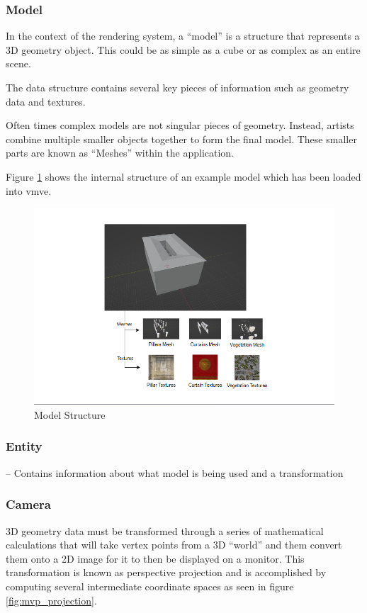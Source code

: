 \documentclass[11pt]{article}
\begin{document}
\subsubsection{Model}
In the context of the rendering system, a ``model'' is a structure that represents
a 3D geometry object. This could be as simple as a cube or as complex as an
entire scene.

The data structure contains several key pieces of information such as geometry data
and textures. 

Often times complex models are not singular pieces of geometry. Instead, artists
combine multiple smaller objects together to form the final model. These smaller
parts are known as ``Meshes'' within the application.

Figure \ref{fig:model} shows the internal structure of an example model which has been
loaded into \gls{vmve}.
\begin{figure}[h!]
  \centering
  \includegraphics[width=\textwidth]{images/model.png}
  \caption{Model Structure}
  \label{fig:model}
\end{figure}

\subsubsection{Entity}
-- Contains information about what model is being used and a transformation


\subsubsection{Camera}
3D geometry data must be transformed through a series of mathematical
calculations that will take vertex points from a 3D ``world'' and them convert
them onto a 2D image for it to then be displayed on a monitor. This
transformation is known as perspective projection \cite{3d_projection} and is
accomplished by computing several intermediate coordinate spaces as seen in
figure \ref{fig:mvp_projection}.
\end{document}
